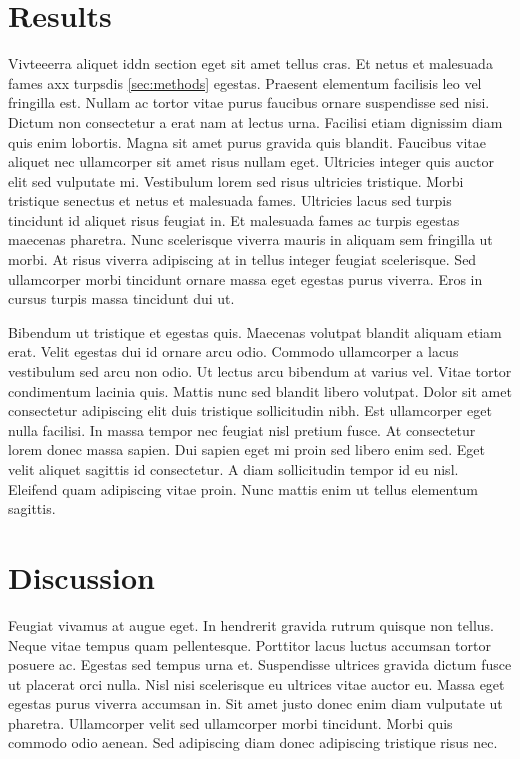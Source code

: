 \hypertarget{results}{%
\section{Results}\label{results}}

Vivteeerra aliquet iddn section eget sit amet tellus cras. Et netus et
malesuada fames axx turpsdis \ref{sec:methods} egestas. Praesent
elementum facilisis leo vel fringilla est. Nullam ac tortor vitae purus
faucibus ornare suspendisse sed nisi. Dictum non consectetur a erat nam
at lectus urna. Facilisi etiam dignissim diam quis enim lobortis. Magna
sit amet purus gravida quis blandit. Faucibus vitae aliquet nec
ullamcorper sit amet risus nullam eget. Ultricies integer quis auctor
elit sed vulputate mi. Vestibulum lorem sed risus ultricies tristique.
Morbi tristique senectus et netus et malesuada fames. Ultricies lacus
sed turpis tincidunt id aliquet risus feugiat in. Et malesuada fames ac
turpis egestas maecenas pharetra. Nunc scelerisque viverra mauris in
aliquam sem fringilla ut morbi. At risus viverra adipiscing at in tellus
integer feugiat scelerisque. Sed ullamcorper morbi tincidunt ornare
massa eget egestas purus viverra. Eros in cursus turpis massa tincidunt
dui ut.

Bibendum ut tristique et egestas quis. Maecenas volutpat blandit aliquam
etiam erat. Velit egestas dui id ornare arcu odio. Commodo ullamcorper a
lacus vestibulum sed arcu non odio. Ut lectus arcu bibendum at varius
vel. Vitae tortor condimentum lacinia quis. Mattis nunc sed blandit
libero volutpat. Dolor sit amet consectetur adipiscing elit duis
tristique sollicitudin nibh. Est ullamcorper eget nulla facilisi. In
massa tempor nec feugiat nisl pretium fusce. At consectetur lorem donec
massa sapien. Dui sapien eget mi proin sed libero enim sed. Eget velit
aliquet sagittis id consectetur. A diam sollicitudin tempor id eu nisl.
Eleifend quam adipiscing vitae proin. Nunc mattis enim ut tellus
elementum sagittis.

\hypertarget{discussion}{%
\section{Discussion}\label{discussion}}

Feugiat vivamus at augue eget. In hendrerit gravida rutrum quisque non
tellus. Neque vitae tempus quam pellentesque. Porttitor lacus luctus
accumsan tortor posuere ac. Egestas sed tempus urna et. Suspendisse
ultrices gravida dictum fusce ut placerat orci nulla. Nisl nisi
scelerisque eu ultrices vitae auctor eu. Massa eget egestas purus
viverra accumsan in. Sit amet justo donec enim diam vulputate ut
pharetra. Ullamcorper velit sed ullamcorper morbi tincidunt. Morbi quis
commodo odio aenean. Sed adipiscing diam donec adipiscing tristique
risus nec.

